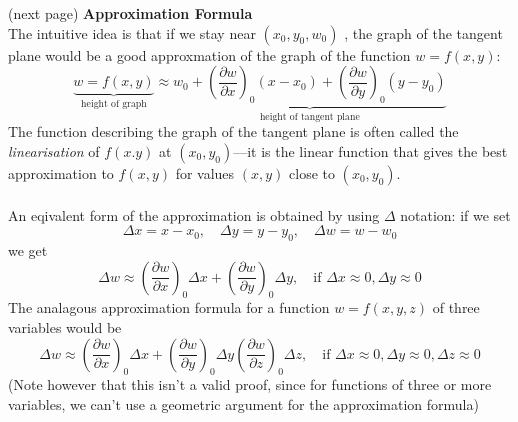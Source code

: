 \documentclass{report}
\begin{document}
(next page)
\newpage
\noindent\textbf{Approximation Formula}\\
The intuitive idea is that if we stay near $(x_0,y_0,w_0)$
, the graph of the tangent plane would be a good approxmation of the graph of the function $w=f(x,y)$:
\begin{equation*}
\underbrace{w=f(x,y)}_{\text{height of graph}}
\approx\underbrace{w_0+\left(\frac{\partial w}{\partial x}\right)_0(x-x_0)+
\left(\frac{\partial w}{\partial y}\right)_0(y-y_0)}_
{\text{height of tangent plane}}
\end{equation*}
The function describing the graph of the tangent plane is often called the \textit{linearisation} of $f(x.y)$ at
$(x_0,y_0)$---it is the linear function that gives the best approximation to $f(x,y)$ for values $(x,y)$ 
close to $(x_0,y_0)$.\\
\vspace{1mm}\\
An eqivalent form of the approximation is obtained by using $\Delta$ notation: if we set
\begin{equation*}
\Delta x=x-x_0,\quad\Delta y=y-y_0,\quad\Delta w=w-w_0
\end{equation*}
we get
\begin{equation*}
\Delta w\approx\left(\frac{\partial w}{\partial x}\right)_0\Delta x+
\left(\frac{\partial w}{\partial y}\right)_0\Delta y,
\quad\text{if }\Delta x\approx0,\Delta y\approx0
\end{equation*}
The analagous approximation formula for a function $w=f(x,y,z)$ of three variables would be
\begin{equation*}
\Delta w\approx\left(\frac{\partial w}{\partial x}\right)_0\Delta x+
\left(\frac{\partial w}{\partial y}\right)_0\Delta y
\left(\frac{\partial w}{\partial z}\right)_0\Delta z,
\quad\text{if }\Delta x\approx0,\Delta y\approx0
,\Delta z\approx0
\end{equation*}
(Note however that this isn't a valid proof, since for functions of three or more variables, 
we can't use a geometric argument for the approximation formula)
\newpage
\end{document}
